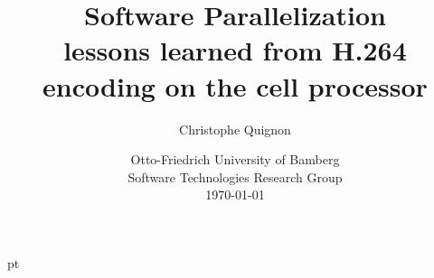 \documentclass[a4paper]{article}
\begin{document}
\title{\vskip 36pt Software Parallelization\\
lessons learned from H.264 encoding on the cell processor}

\author{Christophe Quignon}

\date{Otto-Friedrich University of Bamberg\\
Software Technologies Research Group\\
\today}

\maketitle


\noindent

\newpage
{} pt
\tableofcontents
\newpage

\vskip 36pt

\vskip 36pt
%

\vskip 36pt

\vskip 36pt

\vskip 36pt

%
\newpage





   
\end{document}
